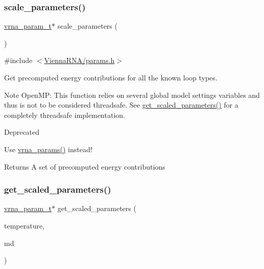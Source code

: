 \subsubsection{\texorpdfstring{scale\+\_\+parameters()}{scale\_parameters()}}
{\footnotesize\ttfamily \mbox{\hyperlink{group__energy__parameters_ga8a69ca7d787e4fd6079914f5343a1f35}{vrna\+\_\+param\+\_\+t}}$\ast$ scale\+\_\+parameters (\begin{DoxyParamCaption}\item[{void}]{ }\end{DoxyParamCaption})}



{\ttfamily \#include $<$\mbox{\hyperlink{params_8h}{Vienna\+R\+N\+A/params.\+h}}$>$}



Get precomputed energy contributions for all the known loop types. 

\begin{DoxyNote}{Note}
Open\+MP\+: This function relies on several global model settings variables and thus is not to be considered threadsafe. See \mbox{\hyperlink{group__energy__parameters_ga7fa6a000d7c16feab939f2c4ee626197}{get\+\_\+scaled\+\_\+parameters()}} for a completely threadsafe implementation.
\end{DoxyNote}
\begin{DoxyRefDesc}{Deprecated}
\item[\mbox{\hyperlink{deprecated__deprecated000099}{Deprecated}}]Use \mbox{\hyperlink{group__energy__parameters_gad0e3e7e74bdc50d1709d40c92993185e}{vrna\+\_\+params()}} instead!\end{DoxyRefDesc}


\begin{DoxyReturn}{Returns}
A set of precomputed energy contributions 
\end{DoxyReturn}
\mbox{\label{group__energy__parameters_ga7fa6a000d7c16feab939f2c4ee626197}} 
\subsubsection{\texorpdfstring{get\+\_\+scaled\+\_\+parameters()}{get\_scaled\_parameters()}}
{\footnotesize\ttfamily \mbox{\hyperlink{group__energy__parameters_ga8a69ca7d787e4fd6079914f5343a1f35}{vrna\+\_\+param\+\_\+t}}$\ast$ get\+\_\+scaled\+\_\+parameters (\begin{DoxyParamCaption}\item[{double}]{temperature,  }\item[{\mbox{\hyperlink{group__model__details_ga1f8a10e12a0a1915f2a4eff0b28ea17c}{vrna\+\_\+md\+\_\+t}}}]{md }\end{DoxyParamCaption})}



